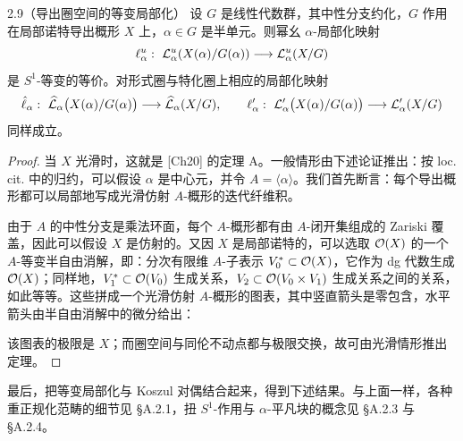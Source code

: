 \begin{thm}{2.9（导出圈空间的等变局部化）}\label{thm:a5-02-4}
设 $G$ 是线性代数群，其中性分支约化，$G$ 作用在局部诺特导出概形 $X$ 上，$\alpha\in G$ 是半单元。则幂幺 $\alpha$-局部化映射
\[
\ell^u_\alpha:\ \LL^u_\alpha(X(\alpha)/G(\alpha))\lra\LL^u_\alpha(X/G)
\]
是 $S^1$-等变的等价。对形式圈与特化圈上相应的局部化映射
\[
\hat\ell_\alpha:\ \wh\LL_\alpha\bigl(X(\alpha)/G(\alpha)\bigr)\lra\wh\LL_\alpha(X/G),\qquad
\ell'_\alpha:\ \LL'_\alpha\bigl(X(\alpha)/G(\alpha)\bigr)\lra\LL'_\alpha(X/G)
\]
同样成立。
\end{thm}

\begin{proof}
当 $X$ 光滑时，这就是 [Ch20] 的定理 A。一般情形由下述论证推出：按 loc. cit. 中的归约，可以假设 $\alpha$ 是中心元，并令 $A=\langle\alpha\rangle$。我们首先断言：每个导出概形都可以局部地写成光滑仿射 $A$-概形的迭代纤维积。

由于 $A$ 的中性分支是乘法环面，每个 $A$-概形都有由 $A$-闭开集组成的 Zariski 覆盖，因此可以假设 $X$ 是仿射的。又因 $X$ 是局部诺特的，可以选取 $\mathcal{O}(X)$ 的一个 $A$-等变半自由消解，即：分次有限维 $A$-子表示 $V^*_0\subset\mathcal{O}(X)$，它作为 dg 代数生成 $\mathcal{O}(X)$；同样地，$V^*_1\subset\mathcal{O}(V_0)$ 生成关系，$V_2\subset\mathcal{O}(V_0\times V_1)$ 生成关系之间的关系，如此等等。这些拼成一个光滑仿射 $A$-概形的图表，其中竖直箭头是零包含，水平箭头由半自由消解中的微分给出：
\begin{center}
\end{center}
该图表的极限是 $X$；而圈空间与同伦不动点都与极限交换，故可由光滑情形推出定理。
\end{proof}

最后，把等变局部化与 Koszul 对偶结合起来，得到下述结果。与上面一样，各种重正规化范畴的细节见 §A.2.1，扭 $S^1$-作用与 $\alpha$-平凡块的概念见 §A.2.3 与 §A.2.4。

